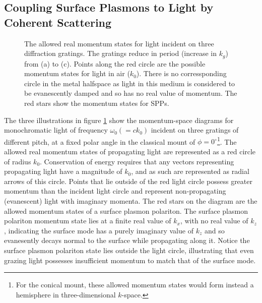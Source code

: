\subsection{Coupling Surface Plasmons to Light by Coherent Scattering}
\begin{figure}
\begin{center}
\subfigure[]{\label{fig:grating-indexiticesA}}
\subfigure[]{\label{fig:grating-indexiticesB}}
\subfigure[]{\label{fig:grating-indexiticesC}}
\caption[The allowed real momentum states for light incident on three diffraction gratings.]{The allowed real momentum states for light incident on three diffraction gratings. The gratings reduce in period (increase in $k_g$) from (a) to (c). Points along the red circle are the possible momentum states for light in air ($k_0$). There is no corressponding circle in the metal halfspace as light in this medium is considered to be evanescently damped and so has no real value of momentum. The red stars show the momentum states for SPPs. \label{fig:grating-indexitices}}
\end{center}
\end{figure}

The three illustrations in figure \ref{fig:grating-indexitices} show the momentum-space diagrams for monochromatic light of frequency $\omega_0 (=ck_0)$ incident on three gratings of different pitch, at a fixed polar angle in the classical mount of $\phi=0^\circ$\footnote{For the conical mount, these allowed momentum states would form instead a hemisphere in three-dimensional $k$-space.}. 
The allowed real momentum states of propagating light are represented as a red circle of radius $k_0$. Conservation of energy requires that any vectors representing propagating light have a magnitude of $k_0$, and as such are represented as radial arrows of this circle. Points that lie outside of the red light circle possess greater momentum than the incident light circle and represent non-propagating (evanescent) light with imaginary momenta. The red stars on the diagram are the allowed momentum states of a surface plasmon polariton. The surface plasmon polariton momentum state lies at a finite real value of $k_x$, with no real value of $k_z$, indicating the surface mode has a purely imaginary value of $k_z$ and so evanesently decays normal to the surface while propagating along it. Notice the surface plasmon polariton state lies outside the light circle, illustrating that even grazing light possesses insufficient momentum to match that of the surface mode.

